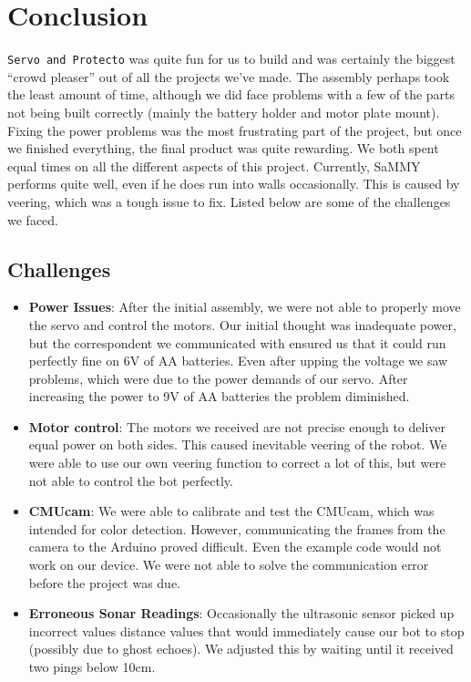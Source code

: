 \documentclass[11pt]{article}
\begin{document}
  

\section{Conclusion}
\texttt{Servo and Protecto} was quite fun for us to build and was certainly the biggest ``crowd pleaser'' out of all the projects we've made.  The assembly perhaps took the least amount of time, although we did face problems with a few of the parts not being built correctly (mainly the battery holder and motor plate mount).  Fixing the power problems was the most frustrating part of the project, but once we finished everything, the final product was quite rewarding.  We both spent equal times on all the different aspects of this project.  Currently, SaMMY performs quite well, even if he does run into walls occasionally.  This is caused by veering, which was a tough issue to fix. Listed below are some of the challenges we faced.
	
	\subsection{Challenges}
		
		\begin{itemize}				
		\item \textbf{Power Issues}: After the initial assembly, we were not able to properly move the servo and control the motors.  Our initial thought was inadequate power, but the correspondent we communicated with ensured us that it could run perfectly fine on 6V of AA batteries.  Even after upping the voltage we saw problems, which were due to the power demands of our servo.  After increasing the power to 9V of AA batteries the problem diminished.
		\item \textbf{Motor control}: The motors we received are not precise enough to deliver equal power on both sides.  This caused inevitable veering of the robot.  We were able to use our own veering function to correct a lot of this, but were not able to control the bot perfectly.
		\item \textbf{CMUcam}: We were able to calibrate and test the CMUcam, which was intended for color detection.  However, communicating the frames from the camera to the Arduino proved difficult.  Even the example code would not work on our device. We were not able to solve the communication error before the project was due.
		\item \textbf{Erroneous Sonar Readings}: Occasionally the ultrasonic sensor picked up incorrect values distance values that would immediately cause our bot to stop (possibly due to ghost echoes).  We adjusted this by waiting until it received two pings below 10cm.
		\end{itemize}
\end{document}
